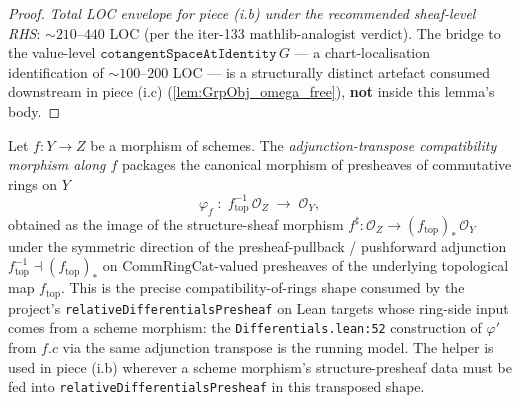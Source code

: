 \begin{proof}
  \emph{Total LOC envelope for piece (i.b) under the recommended sheaf-level RHS}: \(\sim 210\)--\(440\) LOC (per the iter-133 mathlib-analogist verdict). The bridge to the value-level \(\texttt{cotangentSpaceAtIdentity}\,G\) — a chart-localisation identification of \(\sim 100\)--\(200\) LOC — is a structurally distinct artefact consumed downstream in piece (i.c) (\cref{lem:GrpObj_omega_free}), \textbf{not} inside this lemma's body.
\end{proof}

\begin{definition}
  \label{def:GrpObj_schemeHomRingCompatibility}
  
  Let \(f \colon Y \to Z\) be a morphism of schemes. The \emph{adjunction-transpose compatibility morphism along \(f\)} packages the canonical morphism of presheaves of commutative rings on \(Y\)
  \[
    \varphi_f \;\colon\; f_{\mathrm{top}}^{-1}\,\mathcal O_Z \;\longrightarrow\; \mathcal O_Y,
  \]
  obtained as the image of the structure-sheaf morphism \(f^{\sharp} \colon \mathcal O_Z \to (f_{\mathrm{top}})_{*}\,\mathcal O_Y\) under the symmetric direction of the presheaf-pullback / pushforward adjunction \(f_{\mathrm{top}}^{-1} \dashv (f_{\mathrm{top}})_{*}\) on \(\mathrm{CommRingCat}\)-valued presheaves of the underlying topological map \(f_{\mathrm{top}}\). This is the precise compatibility-of-rings shape consumed by the project's \texttt{relativeDifferentialsPresheaf} on Lean targets whose ring-side input comes from a scheme morphism: the \texttt{Differentials.lean:52} construction of \(\varphi'\) from \(f.c\) via the same adjunction transpose is the running model. The helper is used in piece (i.b) wherever a scheme morphism's structure-presheaf data must be fed into \texttt{relativeDifferentialsPresheaf} in this transposed shape.
\end{definition}

